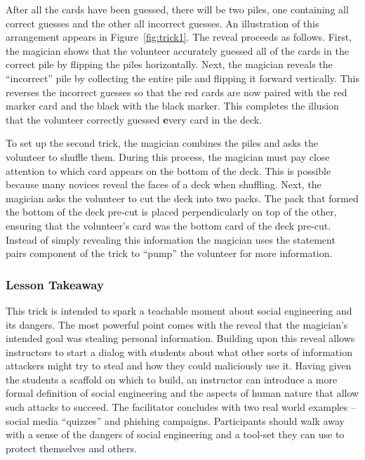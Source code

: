 After all the cards have been guessed, there will be two piles,
one containing all correct guesses and the other
all incorrect guesses.
An illustration of this arrangement appears in Figure~\ref{fig:trick1}.
The reveal proceeds as follows.
First, the magician shows that the volunteer accurately guessed all of the cards
in the correct pile by flipping the piles horizontally.
Next, the magician reveals the ``incorrect'' pile by collecting the
entire pile and flipping it forward vertically.  This
reverses the incorrect guesses so that the red cards are now paired
with the red marker card and the black with the black marker.  This completes
the illusion that the volunteer correctly guessed {\textbf every} card in the
deck.

To set up the second trick, the magician combines the piles and asks the
volunteer to shuffle them.  During this process, the magician must pay close
attention to which card appears on the bottom of the deck.  This is possible
because many novices reveal the faces of a deck when shuffling.  Next,
the magician asks the volunteer to cut the deck into two packs.  The pack that
formed the bottom of the deck pre-cut is placed perpendicularly on
top of the other, ensuring that the volunteer's card was the bottom card of
the deck pre-cut. Instead of simply revealing this information the
magician uses the statement pairs component of the trick to ``pump'' the volunteer
for more information.

%

\subsubsection{Lesson Takeaway}

This trick is intended to spark a teachable moment about
social engineering and
its dangers.
The most powerful point comes with the reveal that the magician's
intended goal was stealing personal information.
Building upon this reveal allows instructors to start a dialog with
students about what other
sorts of information attackers might try to steal and
how they could maliciously use it.
Having given the students a scaffold on which to build,
an instructor can
introduce a more formal definition of social engineering
and the aspects of human nature that allow such attacks to succeed.
The facilitator concludes with two real world examples --
social media ``quizzes'' and phishing campaigns.
Participants should walk away with a sense of the
dangers of social engineering and a tool-set they can use to protect
themselves and others.

